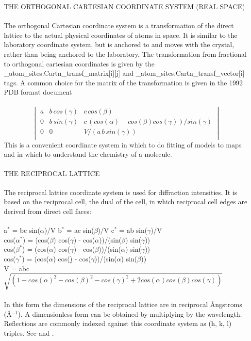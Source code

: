 \documentclass[11pt]{article}
\begin{document}
{THE ORTHOGONAL CARTESIAN COORDINATE SYSTEM (REAL SPACE)\\
~~\\     
The orthogonal Cartesian coordinate system is a transformation of
the direct lattice to the actual physical coordinates of atoms in
space.  It is similar to the laboratory coordinate system, but
is anchored to and moves with the crystal, rather than being
anchored to the laboratory.  The transformation from fractional
to orthogonal cartesian coordinates is given by the \\
         \_atom\_sites.Cartn\_transf\_matrix[i][j]  and 
         \_atom\_sites.Cartn\_transf\_vector[i] 
tags.  A common choice for the matrix of the transformation is 
given in the 1992 PDB format document\\
~~\\
\[\begin{vmatrix}
               a & b \, cos(\gamma) & c \, cos(\beta) \\
               0 & b \, sin(\gamma) & c \, (cos(\alpha) - cos(\beta)cos(\gamma))/sin(\gamma)\\
               0 & 0               & V/( a\, b \, sin(\gamma)) \\
\end{vmatrix}
\]    
This is a convenient coordinate system in which to do fitting
of models to maps and in which to understand the chemistry of
a molecule.\\
~~\\     
THE RECIPROCAL LATTICE\\
~~\\     
The reciprocal lattice coordinate system is used for diffraction
intensities.  It is based on the reciprocal cell, the dual of the cell,
in which reciprocal cell edges are derived from direct cell faces:\\
~~\\     
        a$^*$ = bc sin($\alpha$)/V  b$^*$ = ac sin($\beta$)/V  c$^*$ = ab sin($\gamma$)/V\\
        cos($\alpha^*$) = (cos($\beta$) cos($\gamma$) - cos($\alpha$))/(sin($\beta$) sin($\gamma$))\\
        cos($\beta^*$) = (cos($\alpha$) cos($\gamma$) - cos($\beta$))/(sin($\alpha$) sin($\gamma$))\\
        cos($\gamma^*$) = (cos($\alpha$) cos(\b) - cos($\gamma$))/(sin($\alpha$) sin($\beta$))\\
        V = abc $\sqrt{(1 - cos(\alpha)^2 - cos(\beta)^2 - cos(\gamma)^2 + 2 cos(\alpha) cos(\beta) cos(\gamma) )}$\\
~~\\     
In this form the dimensions of the reciprocal lattice are in reciprocal
{\AA}ngstroms ({\AA}$^{-1}$).  A dimensionless form can be obtained by 
multiplying by the wavelength.  Reflections are commonly indexed against
this coordinate system as (h, k, l) triples.  See \cite{stout1989x} and \cite{PDB1992}.

}
\end{document}
